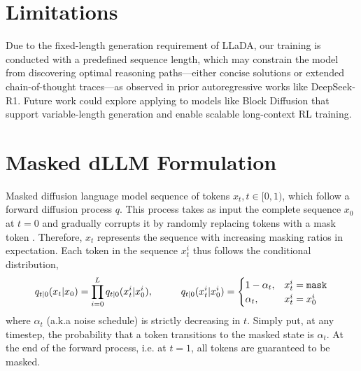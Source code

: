 \appendix
\section{Limitations}
\label{sec:limitation}
Due to the fixed-length generation requirement of LLaDA, our \grpo training is conducted with a predefined sequence length, which may constrain the model from discovering optimal reasoning paths—either concise solutions or extended chain-of-thought traces—as observed in prior autoregressive works like DeepSeek-R1. Future work could explore applying \grpo to models like Block Diffusion that support variable-length generation and enable scalable long-context RL training.



\newpage
\section{Masked dLLM Formulation}
\label{appendix:dllm-training}
Masked diffusion language model sequence of tokens $x_t, t \in [0,1)$, which follow a forward diffusion process $q$. This process takes as input the complete sequence $x_0$ at $t = 0$ and gradually corrupts it by randomly replacing tokens with a mask token \mask. Therefore, $x_t$ represents the sequence with increasing masking ratios in expectation. Each token in the sequence $x_t^i$ thus follows the conditional distribution,
\begin{equation}
\label{eq:forward}
    q_{t|0}(x_t | x_0) = \prod_{i = 0}^{L} q_{t|0}(x_t^i|x_0^i),
    \hspace{1cm} q_{t|0}(x_t^i|x_0^i) = \begin{cases}
                    1 - \alpha_t, & x_t^i = {\texttt{mask}} \\
                    \alpha_t, & x_t^i = x_0^i
                 \end{cases}
\end{equation}
where $\alpha_t$ (a.k.a noise schedule) is strictly decreasing in $t$.
Simply put, at any timestep, the probability that a token transitions to the masked state is $\alpha_t$.  At the end of the forward process, i.e. at $t = 1$, all tokens are guaranteed to be masked. 

